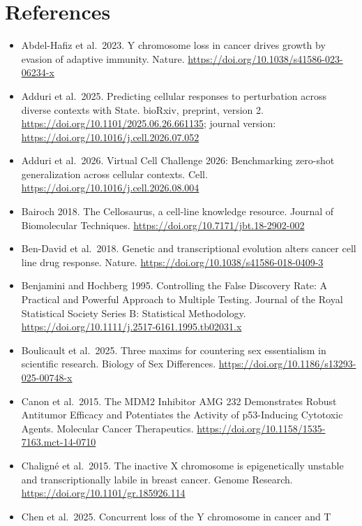 \documentclass[
  11pt,
  letterpaper,
]{article}
\providecommand{\tightlist}{%
  \setlength{\itemsep}{0pt}\setlength{\parskip}{0pt}}
\begin{document}
\section*{References}\label{references}

\begin{itemize}
\tightlist
\item
  Abdel-Hafiz et al.~2023. Y chromosome loss in cancer drives growth by
  evasion of adaptive immunity. Nature.
  \url{https://doi.org/10.1038/s41586-023-06234-x}
\item
  Adduri et al.~2025. Predicting cellular responses to perturbation
  across diverse contexts with State. bioRxiv, preprint, version 2.
  \url{https://doi.org/10.1101/2025.06.26.661135}; journal version:
  \url{https://doi.org/10.1016/j.cell.2026.07.052}
\item
  Adduri et al.~2026. Virtual Cell Challenge 2026: Benchmarking
  zero-shot generalization across cellular contexts. Cell.
  \url{https://doi.org/10.1016/j.cell.2026.08.004}
\item
  Bairoch 2018. The Cellosaurus, a cell-line knowledge resource. Journal
  of Biomolecular Techniques.
  \url{https://doi.org/10.7171/jbt.18-2902-002}
\item
  Ben-David et al.~2018. Genetic and transcriptional evolution alters
  cancer cell line drug response. Nature.
  \url{https://doi.org/10.1038/s41586-018-0409-3}
\item
  Benjamini and Hochberg 1995. Controlling the False Discovery Rate: A
  Practical and Powerful Approach to Multiple Testing. Journal of the
  Royal Statistical Society Series B: Statistical Methodology.
  \url{https://doi.org/10.1111/j.2517-6161.1995.tb02031.x}
\item
  Boulicault et al.~2025. Three maxims for countering sex essentialism
  in scientific research. Biology of Sex Differences.
  \url{https://doi.org/10.1186/s13293-025-00748-x}
\item
  Canon et al.~2015. The MDM2 Inhibitor AMG 232 Demonstrates Robust
  Antitumor Efficacy and Potentiates the Activity of p53-Inducing
  Cytotoxic Agents. Molecular Cancer Therapeutics.
  \url{https://doi.org/10.1158/1535-7163.mct-14-0710}
\item
  Chaligné et al.~2015. The inactive X chromosome is epigenetically
  unstable and transcriptionally labile in breast cancer. Genome
  Research. \url{https://doi.org/10.1101/gr.185926.114}
\item
  Chen et al.~2025. Concurrent loss of the Y chromosome in cancer and T

\end{itemize}
\end{document}
